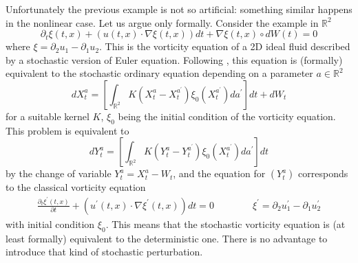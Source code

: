 \documentclass[a4paper,10pt]{article}
\begin{document}
Unfortunately the previous example is not so artificial: something similar
happens in the nonlinear case. Let us argue only formally. Consider the
example in $\mathbb{R}^{2}$%
\[
\partial_{t}\xi\left(  t,x\right)  +\left(  u\left(  t,x\right)  \cdot
\nabla\xi\left(  t,x\right)  \right)  dt+\nabla\xi\left(  t,x\right)  \circ
dW\left(  t\right)  =0
\]
where $\xi=\partial_{2}u_{1}-\partial_{1}u_{2} $. This is the vorticity
equation of a 2D ideal fluid described by a stochastic version of Euler
equation. Following \cite{MajBar}, this equation is (formally) equivalent to
the stochastic ordinary equation depending on a parameter $a\in\mathbb{R}^{2}$%
\[
dX_{t}^{a}=\left[  \int_{\mathbb{R}^{2}}K( X_{t}^{a}-X_{t}^{a^{\prime}})
\xi_{0}( X_{t}^{a^{\prime}} ) da^{\prime}\right]  dt+dW_{t}%
\]
for a suitable kernel $K$, $\xi_{0}$ being the initial condition of the
vorticity equation. This problem is equivalent to
\[
dY_{t}^{a}=\left[  \int_{\mathbb{R}^{2}}K( Y_{t}^{a}-Y_{t}^{a^{\prime}})
\xi_{0}( X_{t}^{a^{\prime}}) da^{\prime}\right]  dt
\]
by the change of variable $Y_{t}^{a}=X_{t}^{a}-W_{t}$, and the equation for
$\left(  Y_{t}^{a}\right)  $ corresponds to the classical vorticity equation
\begin{align*}
\frac{\partial_{t}\xi^{\prime}\left(  t,x\right)  }{\partial t}+\left(
u^{\prime}\left(  t,x\right)  \cdot\nabla\xi^{\prime}\left(  t,x\right)
\right)  dt =0 \qquad\qquad\xi^{\prime} =\partial_{2}u_{1}^{\prime}%
-\partial_{1}u_{2}^{\prime}%
\end{align*}
with initial condition $\xi_{0}$. This means that the stochastic vorticity
equation is (at least formally) equivalent to the deterministic one. There is
no advantage to introduce that kind of stochastic perturbation.




\bigskip

\bigskip
\end{document}
